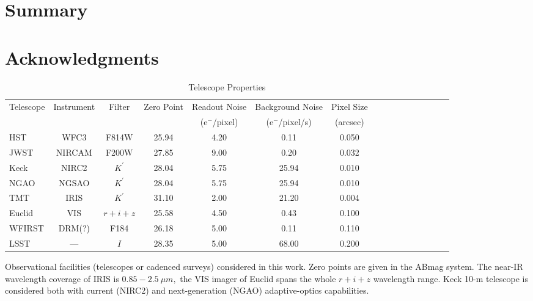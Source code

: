 \documentclass[a4paper,11pt]{article}
\begin{document}
\section{Summary}

\section*{Acknowledgments}










\clearpage
\begin{table}\footnotesize
\begin{center}
\caption{Telescope Properties}
\begin{tabular}{lccccccccccccccc|}
\hline \hline
Telescope & Instrument & Filter & Zero Point & Readout Noise & Background Noise & Pixel Size \\
 & & & & (e$^-$/pixel) & (e$^-$/pixel/s) & (arcsec) \\
\hline
HST  & WFC3  &   F814W   &   25.94    &   4.20      &    0.11     &     0.050    \\
  JWST & NIRCAM  &   F200W   &    27.85   &    9.00     &     0.20    &      0.032  \\
  Keck & NIRC2  &  $K^\prime$ &   28.04    &   5.75     &  25.94      &  0.010      \\
 NGAO & NGSAO  &   $K^\prime$  &     28.04  &     5.75   &    25.94    &    0.010     \\
  TMT & IRIS  &  $K^\prime$   &  31.10   &  2.00   &     21.20    &      0.004  \\
  Euclid & VIS & $r+i+z$  &    25.58   &      4.50   &     0.43    &      0.100   \\
  WFIRST &  DRM(?) & F184    &   26.18    &     5.00    &    0.11     &     0.110   \\
  LSST   & ---  &   $I$    &     28.35  &       5.00  &      68.00   &        0.200  \\
\hline
\hline
\end{tabular}
\begin{tablenotes}
\item 
Observational facilities (telescopes or cadenced surveys) considered in this work.
 Zero points are given in the ABmag system. The near-IR wavelength coverage of IRIS is $0.85-2.5~\mu m,$ the VIS imager of Euclid spans the whole $r+i+z$ wavelength range. Keck 10-m telescope is considered both with current (NIRC2) and next-generation (NGAO) adaptive-optics capabilities.\\
\end{tablenotes}
\label{tab:telescopes parameters}
\end{center}
\end{table}
\end{document}
